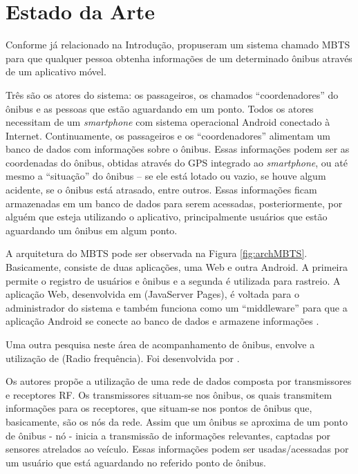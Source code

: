 \section{Estado da Arte}

Conforme já relacionado na Introdução,  propuseram um sistema chamado MBTS para que qualquer pessoa obtenha informações de um determinado ônibus através de um aplicativo móvel. 

Três são os atores do sistema: os passageiros, os chamados ``coordenadores'' do ônibus e as pessoas que estão aguardando em um ponto. Todos os atores necessitam de um \textit{smartphone} com sistema operacional Android conectado à Internet. Continuamente, os passageiros e os ``coordenadores'' alimentam um banco de dados com informações sobre o ônibus. Essas informações podem ser as coordenadas do ônibus, obtidas através do GPS integrado ao \emph{smartphone}, ou até mesmo a ``situação'' do ônibus -- se ele está lotado ou vazio, se houve algum acidente, se o ônibus está atrasado, entre outros. Essas informações ficam armazenadas em um banco de dados para serem acessadas, posteriormente, por alguém que esteja utilizando o aplicativo, principalmente usuários que estão aguardando um ônibus em algum ponto. 

A arquitetura do MBTS pode ser observada na Figura \ref{fig:archMBTS}. Basicamente, consiste de duas aplicações, uma Web e outra Android. A primeira permite o registro de usuários e ônibus e a segunda é utilizada para rastreio. A aplicação Web, desenvolvida em  (JavaServer Pages), é voltada para o administrador do sistema e também funciona como um ``middleware'' para que a aplicação Android se conecte ao banco de dados e armazene informações \cite{sujatha}.

Uma outra pesquisa neste área de acompanhamento de ônibus, envolve a utilização de  (Radio frequência). Foi desenvolvida por .

Os autores propõe a utilização de uma rede de dados composta por transmissores e receptores RF. Os transmissores situam-se nos ônibus, os quais transmitem informações para os receptores, que situam-se nos pontos de ônibus que, basicamente, são os nós da rede. Assim que um ônibus se aproxima de um ponto de ônibus - nó - inicia a transmissão de informações relevantes, captadas por sensores atrelados ao veículo. Essas informações podem ser usadas/acessadas por um usuário que está aguardando no referido ponto de ônibus. 

